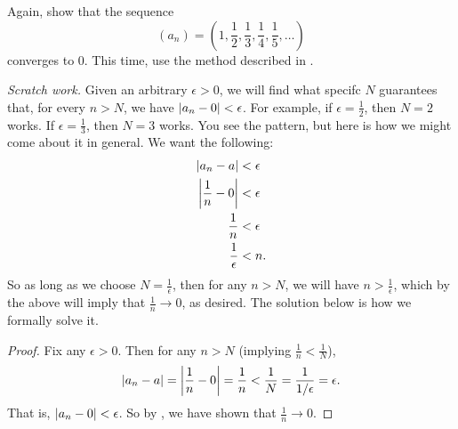 \documentclass[11pt,twoside=off,numbers=noenddot]{scrbook}
\begin{document}
\begin{example}
  Again, show that the sequence
  \[ (a_n) = \left(1, \frac{1}{2}, \frac{1}{3}, \frac{1}{4},
  \frac{1}{5}, \dots\right) \]
  converges to 0. This time, use the method described in
  .

  \textit{Scratch work.} Given an arbitrary $\epsilon > 0$, we will
  find what specifc $N$ guarantees that, for every $n > N$, we have
  $| a_n - 0 | < \epsilon$. For example, if $\epsilon =
  \frac{1}{2}$, then $N = 2$ works. If $\epsilon = \frac{1}{3}$, then
  $N = 3$ works. You see the pattern, but here is how we might come
  about it in general. We want the following:
  \begin{align*}
    | a_n - a | & < \epsilon \\
    \left|\frac{1}{n} - 0\right| & < \epsilon \\
    \frac{1}{n} & < \epsilon \\
    \frac{1}{\epsilon} & < n.
  \end{align*}
  So as long as we choose $N = \frac{1}{\epsilon}$, then for any $n >
  N$, we will have $n > \frac{1}{\epsilon}$, which by the above will
  imply that $\frac{1}{n} \to 0$, as desired. The solution below is
  how we formally solve it.

  \begin{proof}
    Fix any $\epsilon > 0$. Then for any $n > N$ (implying
    $\frac{1}{n} < \frac{1}{N}$),
    \[ | a_n - a | = \left|\frac{1}{n} - 0\right| = \frac{1}{n} <
    \frac{1}{N} = \frac{1}{1/\epsilon} = \epsilon. \]
    That is, $| a_n - 0 | < \epsilon$. So by
    , we have shown that $\frac{1}{n} \to 0$.
  \end{proof}
\end{example}
\end{document}
